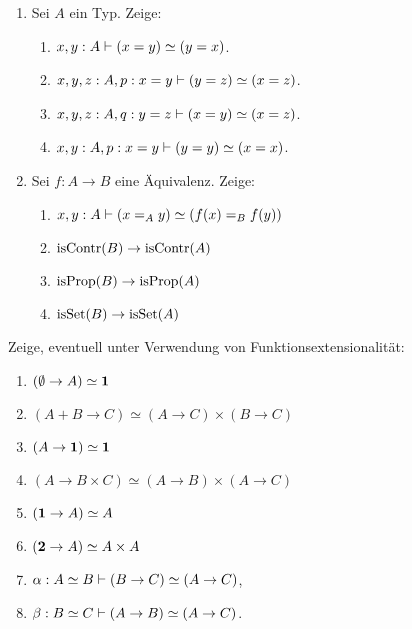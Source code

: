 \documentclass{uebung}
\begin{document}
\begin{exercise}
  \begin{enumerate}
    \item Sei $A$ ein Typ.
      Zeige:
        \begin{enumerate}
          \item $x,y:A \vdash (x=y) \simeq (y=x)$.
          \item $x,y,z:A,p:x=y \vdash (y=z) \simeq (x=z)$.
          \item $x,y,z:A,q:y=z \vdash (x=y) \simeq (x=z)$.
          \item $x,y:A,p:x=y \vdash (y=y) \simeq (x=x)$.
        \end{enumerate}

    \item Sei $f:A\to B$ eine Äquivalenz.
      Zeige:
        \begin{enumerate}
          \item $x,y:A\vdash (x =_A y)\simeq (f(x) =_B f(y))$
          \item $\mathrm{isContr}(B)\to\mathrm{isContr}(A)$
          \item $\mathrm{isProp}(B)\to\mathrm{isProp}(A)$
          \item $\mathrm{isSet}(B)\to\mathrm{isSet}(A)$
        \end{enumerate}
  \end{enumerate}
\end{exercise}

\begin{exercise}
  Zeige, eventuell unter Verwendung von Funktionsextensionalität:
  \begin{multicols}{2}
  \begin{enumerate}
    \item $(\emptyset \to A) \simeq \mathbf{1}$
    \item $(A+B\to C) \simeq (A \to C) \times (B \to C)$
    \item $(A \to \mathbf{1}) \simeq \mathbf{1}$
    \item $(A \to B\times C) \simeq (A \to B) \times (A \to C)$
    \item $(\mathbf{1} \to A)\simeq A$
    \item $(\mathbf{2} \to A)\simeq A\times A$
    \item $\alpha:A\simeq B \vdash (B\to C) \simeq (A\to C)$,
    \item $\beta:B\simeq C \vdash (A\to B)\simeq (A\to C)$.
  \end{enumerate}
  \end{multicols}
\end{exercise}
\end{document}
